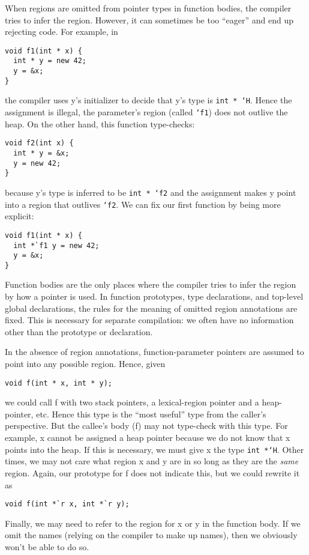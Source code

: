 When regions are omitted from pointer types in function bodies, the
compiler tries to infer the region.  However, it can sometimes be too
``eager'' and end up rejecting code.  For example, in
\begin{verbatim}
void f1(int * x) {
  int * y = new 42;
  y = &x;
}
\end{verbatim}
the compiler uses y's initializer to decide that y's type is
\texttt{int * `H}.  Hence the assignment is illegal, the parameter's
region (called \texttt{`f1}) does not outlive the heap.  On the other
hand, this function type-checks:
\begin{verbatim}
void f2(int x) {
  int * y = &x;
  y = new 42;
}
\end{verbatim}
because y's type is inferred to be \texttt{int * `f2} and the
assignment makes y point into a region that outlives \texttt{`f2}.  We
can fix our first function by being more explicit:
\begin{verbatim}
void f1(int * x) {
  int *`f1 y = new 42;
  y = &x;
}
\end{verbatim}

Function bodies are the only places where the compiler tries to infer
the region by how a pointer is used.  In function prototypes, type
declarations, and top-level global declarations, the rules for the
meaning of omitted region annotations are fixed.  This is necessary
for separate compilation: we often have no information other than the
prototype or declaration.

In the absence of region annotations, function-parameter pointers are
assumed to point into any possible region.  Hence, given
\begin{verbatim}
void f(int * x, int * y);
\end{verbatim}
we could call f with two stack pointers, a lexical-region pointer and
a heap-pointer, etc.  Hence this type is the ``most useful'' type from
the caller's perspective.  But the callee's body (f) may not
type-check with this type.  For example, x cannot be assigned a
heap pointer because we do not know that x points into the heap.  If
this is necessary, we must give x the type \texttt{int *`H}.  Other
times, we may not care what region x and y are in so long as they are
the \emph{same} region.  Again, our prototype for f does not indicate
this, but we could rewrite it as
\begin{verbatim}
void f(int *`r x, int *`r y);
\end{verbatim}
Finally, we may need to refer to the region for x or y in the function
body.  If we omit the names (relying on the compiler to make up
names), then we obviously won't be able to do so.

